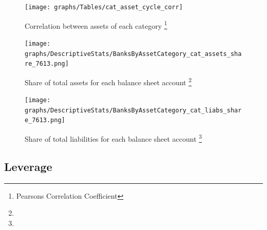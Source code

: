 \documentclass[12pt, a4paper]{article} %
\begin{document}
\begin{figure}[hbtp]
\begin{minipage}{\textwidth}
\centering
\caption[1]{Correlation between assets of each category \footnote{Pearsons Correlation Coefficient} }
\texttt{[image: graphs/Tables/cat\_asset\_cycle\_corr]}
\label{table:cat_assets_corr}
\end{minipage}
\end{figure}


\begin{figure}[hbtp]
\begin{minipage}{\textwidth}
\centering
\caption[1]{Share of total assets for each balance sheet account \footnote{} }
\texttt{[image: graphs/DescriptiveStats/BanksByAssetCategory\_cat\_assets\_share\_7613.png]}
\label{fig:catAssetsShare}
\end{minipage}
\end{figure}


\begin{figure}[hbtp]
\begin{minipage}{\textwidth}
\centering
\caption[1]{Share of total liabilities for each balance sheet account \footnote{} }
\texttt{[image: graphs/DescriptiveStats/BanksByAssetCategory\_cat\_liabs\_share\_7613.png]}
\label{fig:catLiabShare}
\end{minipage}
\end{figure}

\newpage


\subsection{Leverage}
\end{document}
